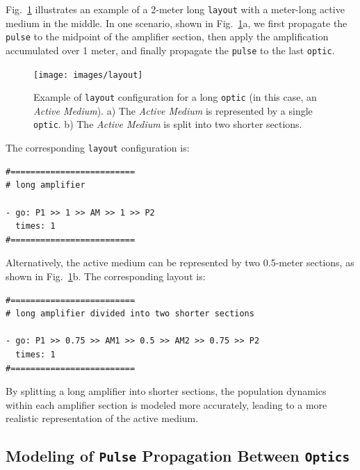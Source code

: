 \documentclass{report}
\begin{document}
Fig.~\ref{fig:layout} illustrates an example of a 2-meter long \texttt{layout} with a meter-long active medium in the middle. In one scenario, shown in Fig.~\ref{fig:layout}a, we first propagate the \texttt{pulse} to the midpoint of the amplifier section, then apply the amplification accumulated over 1 meter, and finally propagate the \texttt{pulse} to the last \texttt{optic}.
\begin{figure}[ht]
\centering
\texttt{[image: images/layout]}
\caption{Example of \texttt{layout} configuration for a long \texttt{optic} (in this case, an \textit{Active Medium}). a) The \textit{Active Medium} is represented by a single \texttt{optic}. b) The \textit{Active Medium} is split into two shorter sections.}\label{fig:layout}
\end{figure}
The corresponding \texttt{layout} configuration is:

\begin{verbatim}
#=========================
# long amplifier

- go: P1 >> 1 >> AM >> 1 >> P2
  times: 1
#=========================
\end{verbatim}

Alternatively, the active medium can be represented by two 0.5-meter sections, as shown in Fig.~\ref{fig:layout}b. The corresponding layout is:

\begin{verbatim}
#=========================
# long amplifier divided into two shorter sections

- go: P1 >> 0.75 >> AM1 >> 0.5 >> AM2 >> 0.75 >> P2
  times: 1
#=========================
\end{verbatim}

By splitting a long amplifier into shorter sections, the population dynamics within each amplifier section is modeled more accurately, leading to a more realistic representation of the active medium.


\subsection{Modeling of \texttt{Pulse} Propagation Between \texttt{Optics}}\label{propagation}
\end{document}
